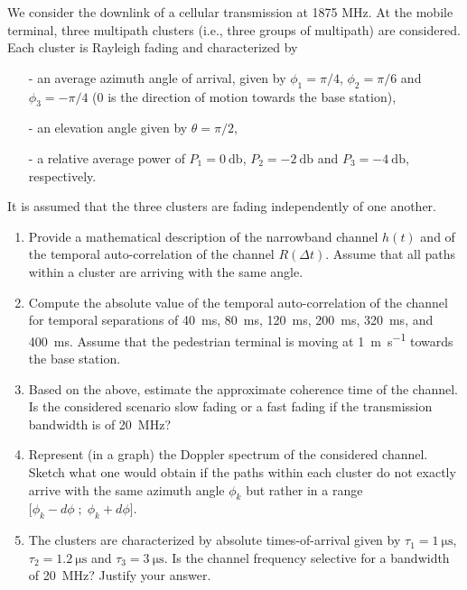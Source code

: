 \documentclass [a4paper, 11pt] {article}
\begin{document}
    \begin{exercise}{1}
        We consider the downlink of a cellular transmission at 1875 MHz. At the mobile terminal, three multipath clusters (i.e., three groups of multipath) are considered. Each cluster is Rayleigh fading and characterized by

        \begin{itemize}
            \item[-] an average azimuth angle of arrival, given by $\phi_1 = \pi/4$, $\phi_2 = \pi/6$ and $\phi_3 = -\pi/4$ (0 is the direction of motion towards the base station),
            \item[-] an elevation angle given by $\theta = \pi/2$,
            \item[-] a relative average power of $P_1 = \SI{0}{\decibel}$, $P_2 = \SI{-2}{\decibel}$ and $P_3 = \SI{-4}{\decibel}$, respectively.
        \end{itemize}


        It is assumed that the three clusters are fading independently of one another.

        \begin{enumerate}
        \item Provide a mathematical description of the narrowband channel $h(t)$ and of the temporal auto-correlation of the channel $R(\Delta t)$. Assume that all paths within a cluster are arriving with the same angle.
        \item Compute the absolute value of the temporal auto-correlation of the channel for temporal separations of \SI{40}{\milli\second}, \SI{80}{\milli\second}, \SI{120}{\milli\second}, \SI{200}{\milli\second}, \SI{320}{\milli\second}, and \SI{400}{\milli\second}. Assume that the pedestrian terminal is moving at \SI{1}{\meter\per\second} towards the base station.
        \item Based on the above, estimate the approximate coherence time of the channel. Is the considered scenario slow fading or a fast fading if the transmission bandwidth is of \SI{20}{\mega\hertz}?
        \item Represent (in a graph) the Doppler spectrum of the considered channel. Sketch what one would obtain if the paths within each cluster do not exactly arrive with the same azimuth angle $\phi_k$ but rather in a range $\big[\phi_k-d\phi \; ; \; \phi_k+d\phi \big]$.
        \item The clusters are characterized by absolute times-of-arrival given by $\tau_1 = \SI{1}{\micro\second}$, $\tau_2 = \SI{1.2}{\micro\second}$ and $\tau_3 = \SI{3}{\micro\second}$. Is the channel frequency selective for a bandwidth of \SI{20}{\mega\hertz}? Justify your answer.
        \end{enumerate}
    \end{exercise}
\end{document}
